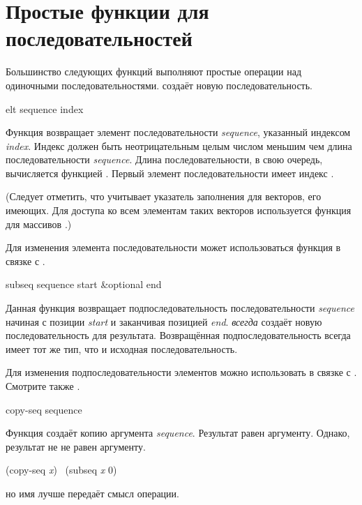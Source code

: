 \section{Простые функции для последовательностей}

Большинство следующих функций выполняют простые операции над одиночными
последовательностями.  создаёт новую последовательность.

\begin{defun}[Функция]
elt sequence index

Функция возвращает элемент последовательности \emph{sequence}, указанный
индексом \emph{index}. Индекс должен быть неотрицательным целым числом меньшим
чем длина последовательности \emph{sequence}. Длина последовательности, в свою
очередь, вычисляется функцией .
Первый элемент последовательности имеет индекс .

(Следует отметить, что  учитывает указатель заполнения для векторов,
его имеющих. Для доступа ко всем элементам таких векторов используется функция
для массивов .)

Для изменения элемента последовательности может использоваться функция
 в связке с .
\end{defun}

\begin{defun}[Функция]
subseq sequence start &optional end

Данная функция возвращает подпоследовательность последовательности
\emph{sequence} начиная с позиции \emph{start} и заканчивая позицией
\emph{end}. 
 \emph{всегда} создаёт новую последовательность для
результата. Возвращённая подпоследовательность всегда имеет тот же тип, что и
исходная последовательность.

Для изменения подпоследовательности элементов можно использовать  в
связке с . Смотрите также .
\end{defun}

\begin{defun}[Функция]
copy-seq sequence

Функция создаёт копию аргумента \emph{sequence}. Результат равен 
аргументу. Однако, результат не не равен  аргументу.
\begin{lisp}
(copy-seq \emph{x}) \EQ\ (subseq \emph{x} 0)
\end{lisp}
но имя  лучше передаёт смысл операции.
\end{defun}

